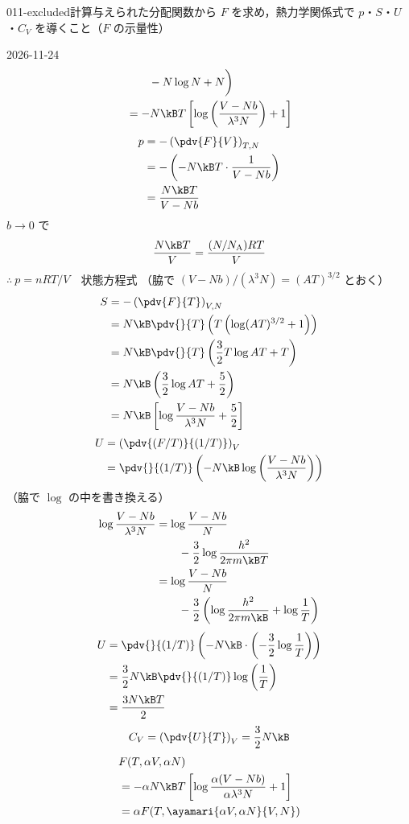 \documentclass[uplatex,dvipdfmx,a4paper,11pt]{jsarticle}
\begin{document}
\begin{mondai}{011-excluded}{計算}{与えられた分配関数から $F$ を求め，熱力学関係式で $p$・$S$・$U$・$C_{V}$ を導くこと（$F$ の示量性）}
\begin{kotaeutsushi}{2026-11-24}
\begin{align*}
&\qquad-N\log N+N\biggr)\\
&=-N\kB T\left[\log\left(\frac{V-Nb}{\lambda^{3}N}\right)+1\right]
\end{align*}
\begin{align*}
p&=-\left(\pdv{F}{V}\right)_{T,N}\\
&=-\left(-N\kB T\cdot\frac{1}{V-Nb}\right)\\
&=\frac{N\kB T}{V-Nb}
\end{align*}
$b\to0$ で
\[ \frac{N\kB T}{V}=\frac{(N/N_{\mathrm{A}})RT}{V} \]
$\therefore\ p=nRT/V$　状態方程式
（脇で $(V-Nb)/(\lambda^{3}N)=(AT)^{3/2}$ とおく）
\begin{align*}
S&=-\left(\pdv{F}{T}\right)_{V,N}\\
&=N\kB\pdv{}{T}\left(T\left(\log(AT)^{3/2}+1\right)\right)\\
&=N\kB\pdv{}{T}\left(\frac{3}{2}T\log AT+T\right)\\
&=N\kB\left(\frac{3}{2}\log AT+\frac{5}{2}\right)\\
&=N\kB\left[\log\frac{V-Nb}{\lambda^{3}N}+\frac{5}{2}\right]
\end{align*}
\begin{align*}
U&=\left(\pdv{(F/T)}{(1/T)}\right)_{V}\\
&=\pdv{}{(1/T)}\left(-N\kB\log\left(\frac{V-Nb}{\lambda^{3}N}\right)\right)
\end{align*}
（脇で $\log$ の中を書き換える）
\begin{align*}
\log\frac{V-Nb}{\lambda^{3}N}&=\log\frac{V-Nb}{N}\\
&\qquad-\frac{3}{2}\log\frac{h^{2}}{2\pi m\kB T}\\
&=\log\frac{V-Nb}{N}\\
&\qquad-\frac{3}{2}\left(\log\frac{h^{2}}{2\pi m\kB}+\log\frac{1}{T}\right)
\end{align*}
\begin{align*}
U&=\pdv{}{(1/T)}\left(-N\kB\cdot\left(-\frac{3}{2}\log\frac{1}{T}\right)\right)\\
&=\frac{3}{2}N\kB\pdv{}{(1/T)}\log\left(\frac{1}{T}\right)\\
&=\frac{3N\kB T}{2}
\end{align*}
\[ C_{V}=\left(\pdv{U}{T}\right)_{V}=\frac{3}{2}N\kB \]
\begin{align*}
&F(T,\alpha V,\alpha N)\\
&=-\alpha N\kB T\left[\log\frac{\alpha(V-Nb)}{\alpha\lambda^{3}N}+1\right]\\
&=\alpha F(T,\ayamari{\alpha V,\alpha N}{V,N})

\end{align*}
\end{kotaeutsushi}
\end{mondai}
\end{document}
